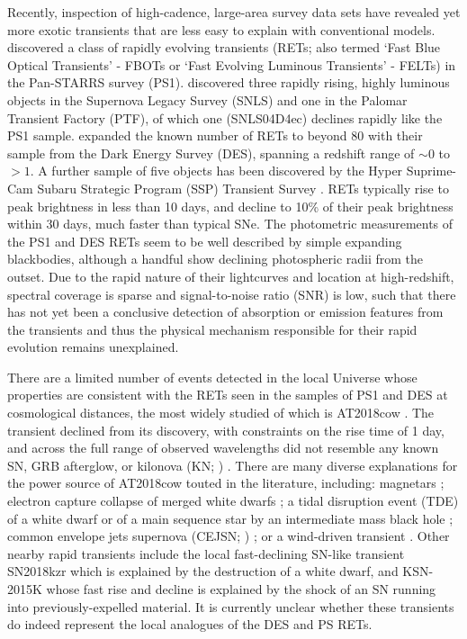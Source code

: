 \documentclass[fleqn,usenatbib,]{mnras}
\newcommand{\replychris}[1]{\color{magenta}#1 \color{black}}
\newcommand{\replylluis}[1]{\color{brown}#1 \color{black}}
\begin{document}
Recently, inspection of high-cadence, large-area survey data sets have revealed yet more exotic transients that are less easy to explain with conventional models. \citet{Drout2014} discovered a class of rapidly evolving transients (RETs; also termed `Fast Blue Optical Transients' - FBOTs or `Fast Evolving Luminous Transients' - FELTs) in the Pan-STARRS survey (PS1). \replychris{\citet{Arcavi2016} discovered three rapidly rising, highly luminous objects in the Supernova Legacy Survey (SNLS) and one in the Palomar Transient Factory (PTF), of which one (SNLS04D4ec) declines rapidly like the PS1 sample.} \citet{Pursiainen2018} expanded the known number of RETs to beyond 80 with their sample from the Dark Energy Survey (DES), spanning a redshift range of $\sim 0$ to $>1$. A further sample of five objects has been discovered by the Hyper Suprime-Cam Subaru Strategic Program (SSP) Transient Survey \citep{Tampo2020}. RETs typically rise to peak brightness in less than 10 days, and decline to 10\% of their peak brightness within 30 days, much faster than typical SNe. The photometric measurements of the PS1 and DES RETs seem to be well described by simple expanding blackbodies, although a handful show declining photospheric radii from the outset. Due to the rapid nature of their lightcurves and location at high-redshift, spectral coverage is sparse and signal-to-noise ratio (SNR) is low, such that there has not yet been a conclusive detection of absorption or emission features from the transients and thus the physical mechanism responsible for their rapid evolution remains unexplained.

There are a limited number of events detected in the local Universe whose properties are consistent with the RETs seen in the samples of PS1 and DES at cosmological distances, the most widely studied of which is AT2018cow \citep[e.g.][]{Prentice2018,Perley2019}. The transient declined from its discovery, with constraints on the rise time of 1 day, and across the full range of observed wavelengths did not resemble any known SN, GRB afterglow, or kilonova \replylluis{(KN; \citealt{Ho2019})}. There are many diverse explanations for the power source of AT2018cow touted in the literature, including: magnetars \citep{Mohan2020}; electron capture collapse of merged white dwarfs \citep{Lyutikov2019}; a tidal disruption event (TDE) of a white dwarf \citep{Kuin2019} or of a main sequence star by an intermediate mass black hole \citep{Perley2019}; common envelope jets supernova \replylluis{(CEJSN; \citealt{Soker2019})}; \replychris{or a wind-driven transient \citep{Uno2020}}.
Other nearby rapid transients include the local fast-declining SN-like transient SN2018kzr \citep{McBrien2019} which is explained by the destruction of a white dwarf, and KSN-2015K \citep{Rest2018} whose fast rise and decline is explained by the shock of an SN running into previously-expelled material.  It is currently unclear whether these transients do indeed represent the local analogues of the DES and PS RETs.
\end{document}
